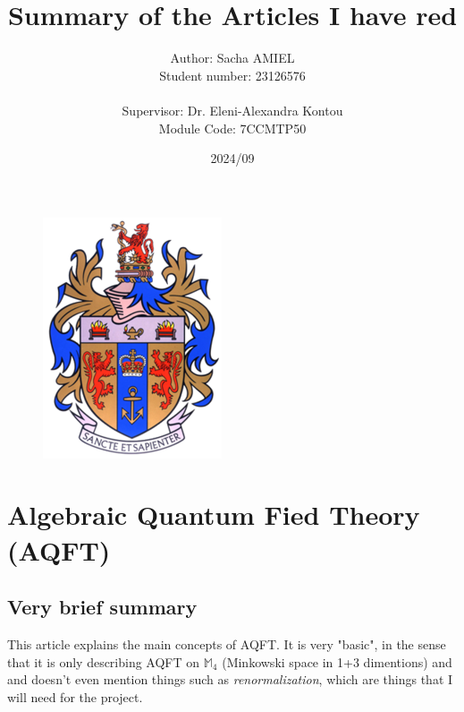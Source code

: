 \documentclass[a4paper,11pt]{article}
\title{Summary of the Articles I have red}
\author{Author: Sacha AMIEL \\
Student number: 23126576\\
\\ Supervisor: Dr. Eleni-Alexandra Kontou \\ Module Code: 7CCMTP50}
\date{2024/09}
\numberwithin{equation}{section}
\theoremstyle{definition}
\begin{document}
\clearpage\maketitle
\thispagestyle{empty}
\begin{figure}[H]
    \centering
    \vspace{100mm}
    \includegraphics[width=0.2\columnwidth]{Template/kcl_logo.png}
\end{figure}

\newpage

\tableofcontents

\newpage
\section{Algebraic Quantum Fied Theory (AQFT)}
\label{Sec:AQFT}
\subsection{Very brief summary}
This article \cite{AQFT_Intro} explains the main concepts of AQFT. It is very "basic", in the sense that it is only describing AQFT on $\mathbb{M}_4$ (Minkowski space in 1+3 dimentions) and and doesn't even mention things such as \emph{renormalization}, which are things that I will need for the project.
\end{document}
